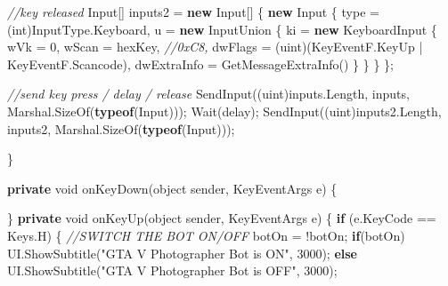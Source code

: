 \documentclass[
  openany]{book}
\newenvironment{Shaded}{\begin{snugshade}}{\end{snugshade}}
\newcommand{\CommentTok}[1]{\textcolor[rgb]{0.56,0.35,0.01}{\textit{#1}}}
\newcommand{\DataTypeTok}[1]{\textcolor[rgb]{0.13,0.29,0.53}{#1}}
\newcommand{\DecValTok}[1]{\textcolor[rgb]{0.00,0.00,0.81}{#1}}
\newcommand{\FunctionTok}[1]{\textcolor[rgb]{0.00,0.00,0.00}{#1}}
\newcommand{\KeywordTok}[1]{\textcolor[rgb]{0.13,0.29,0.53}{\textbf{#1}}}
\newcommand{\NormalTok}[1]{#1}
\newcommand{\StringTok}[1]{\textcolor[rgb]{0.31,0.60,0.02}{#1}}
\begin{document}
\begin{Shaded}
\begin{Highlighting}[]
            \CommentTok{//key released}
\NormalTok{            Input[] inputs2 = }\KeywordTok{new}\NormalTok{ Input[]}
\NormalTok{            \{}
                \KeywordTok{new}\NormalTok{ Input}
\NormalTok{                \{}
\NormalTok{                    type = (}\DataTypeTok{int}\NormalTok{)InputType.}\FunctionTok{Keyboard}\NormalTok{,}
\NormalTok{                    u = }\KeywordTok{new}\NormalTok{ InputUnion}
\NormalTok{                    \{}
\NormalTok{                        ki = }\KeywordTok{new}\NormalTok{ KeyboardInput}
\NormalTok{                        \{}
\NormalTok{                            wVk = }\DecValTok{0}\NormalTok{,}
\NormalTok{                            wScan = hexKey, }\CommentTok{//0xC8,}
\NormalTok{                            dwFlags = (}\DataTypeTok{uint}\NormalTok{)(KeyEventF.}\FunctionTok{KeyUp}\NormalTok{ | KeyEventF.}\FunctionTok{Scancode}\NormalTok{),}
\NormalTok{                            dwExtraInfo = }\FunctionTok{GetMessageExtraInfo}\NormalTok{()}
\NormalTok{                        \}}
\NormalTok{                    \}}
\NormalTok{                \}}
\NormalTok{            \};}

            \CommentTok{//send key press / delay / release}
            \FunctionTok{SendInput}\NormalTok{((}\DataTypeTok{uint}\NormalTok{)inputs.}\FunctionTok{Length}\NormalTok{, inputs, Marshal.}\FunctionTok{SizeOf}\NormalTok{(}\KeywordTok{typeof}\NormalTok{(Input)));}
            \FunctionTok{Wait}\NormalTok{(delay);}
            \FunctionTok{SendInput}\NormalTok{((}\DataTypeTok{uint}\NormalTok{)inputs2.}\FunctionTok{Length}\NormalTok{, inputs2, Marshal.}\FunctionTok{SizeOf}\NormalTok{(}\KeywordTok{typeof}\NormalTok{(Input)));}

\NormalTok{        \}}

        \KeywordTok{private} \DataTypeTok{void} \FunctionTok{onKeyDown}\NormalTok{(}\DataTypeTok{object}\NormalTok{ sender, KeyEventArgs e)}
\NormalTok{        \{}
           
\NormalTok{        \}}
        \KeywordTok{private} \DataTypeTok{void} \FunctionTok{onKeyUp}\NormalTok{(}\DataTypeTok{object}\NormalTok{ sender, KeyEventArgs e)}
\NormalTok{        \{}
           \KeywordTok{if}\NormalTok{ (e.}\FunctionTok{KeyCode}\NormalTok{ == Keys.}\FunctionTok{H}\NormalTok{)}
\NormalTok{           \{}
              \CommentTok{//SWITCH THE BOT ON/OFF}
\NormalTok{              botOn = !botOn;}
              \KeywordTok{if}\NormalTok{(botOn) UI.}\FunctionTok{ShowSubtitle}\NormalTok{(}\StringTok{"GTA V Photographer Bot is ON"}\NormalTok{, }\DecValTok{3000}\NormalTok{);}
               \KeywordTok{else}\NormalTok{ UI.}\FunctionTok{ShowSubtitle}\NormalTok{(}\StringTok{"GTA V Photographer Bot is OFF"}\NormalTok{, }\DecValTok{3000}\NormalTok{);}
  

\end{Highlighting}
\end{Shaded}
\end{document}
